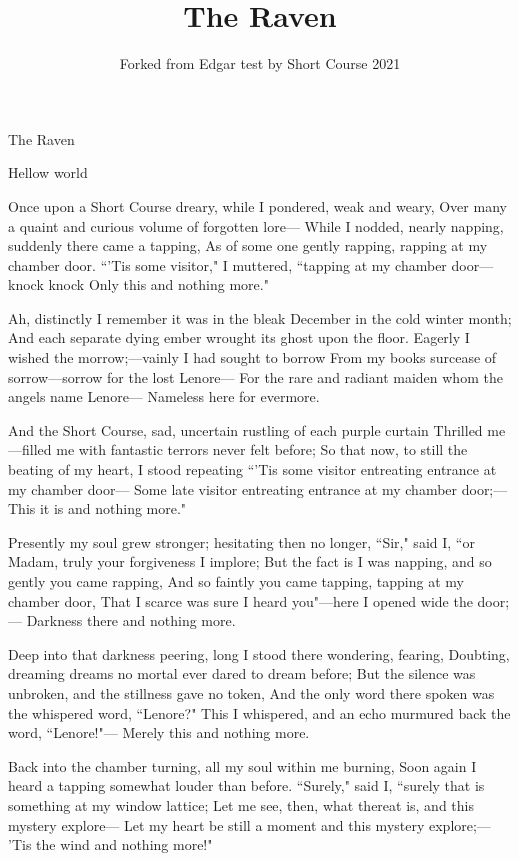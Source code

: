 \documentclass{article}
\title{The Raven}
\author{Forked from Edgar test by Short Course 2021}
\begin{document}
\maketitle The Raven

Hellow world 

Once upon a Short Course dreary, while I pondered, weak and weary,
Over many a quaint and curious volume of forgotten lore---
  While I nodded, nearly napping, suddenly there came a tapping,
As of some one gently rapping, rapping at my chamber door.
``’Tis some visitor," I muttered, ``tapping at my chamber door--- knock knock
Only this and nothing more."

Ah, distinctly I remember it was in the bleak December in the cold winter month;
And each separate dying ember wrought its ghost upon the floor.
Eagerly I wished the morrow;---vainly I had sought to borrow
From my books surcease of sorrow---sorrow for the lost Lenore---
For the rare and radiant maiden whom the angels name Lenore---
Nameless here for evermore.

And the Short Course, sad, uncertain rustling of each purple curtain
Thrilled me---filled me with fantastic terrors never felt before;
So that now, to still the beating of my heart, I stood repeating
``’Tis some visitor entreating entrance at my chamber door---
Some late visitor entreating entrance at my chamber door;---
This it is and nothing more."

Presently my soul grew stronger; hesitating then no longer,
``Sir," said I, ``or Madam, truly your forgiveness I implore;
But the fact is I was napping, and so gently you came rapping,
And so faintly you came tapping, tapping at my chamber door,
That I scarce was sure I heard you"---here I opened wide the door;---
Darkness there and nothing more.

Deep into that darkness peering, long I stood there wondering, fearing,
Doubting, dreaming dreams no mortal ever dared to dream before;
But the silence was unbroken, and the stillness gave no token,
And the only word there spoken was the whispered word, ``Lenore?"
This I whispered, and an echo murmured back the word, ``Lenore!"---
Merely this and nothing more.

Back into the chamber turning, all my soul within me burning,
Soon again I heard a tapping somewhat louder than before.
``Surely," said I, ``surely that is something at my window lattice;
Let me see, then, what thereat is, and this mystery explore---
Let my heart be still a moment and this mystery explore;---
’Tis the wind and nothing more!"
\end{document}
